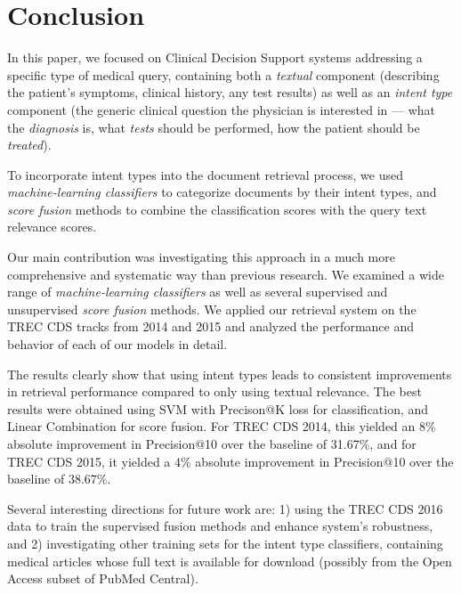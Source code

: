 \chapter{Conclusion}


In this paper, we focused on Clinical Decision Support systems addressing
a specific type of medical query, containing both a \emph{textual} component
(describing the patient's symptoms, clinical history, any test results)
as well as an \emph{intent type} component (the generic clinical question the physician is interested in
--- what the \emph{diagnosis} is, what \emph{tests} should be performed, how the patient should be \emph{treated}).

To incorporate intent types into the document retrieval process, we used
\emph{machine-learning classifiers} to categorize documents by their intent types,
and \emph{score fusion} methods to combine the classification scores with the query text relevance scores.

Our main contribution was investigating this approach in a much more comprehensive and systematic way
than previous research.
We examined a wide range of \emph{machine-learning classifiers}
as well as several supervised and unsupervised \emph{score fusion} methods.
We applied our retrieval system on the TREC CDS tracks from 2014 and 2015 and analyzed
the performance and behavior of each of our models in detail.

The results clearly show that using intent types leads to consistent improvements in retrieval performance
compared to only using textual relevance.
The best results were obtained using SVM with Precison@K loss for classification,
and Linear Combination for score fusion.
For TREC CDS 2014, this yielded an 8\% absolute improvement in Precision@10 over the baseline of 31.67\%,
and for TREC CDS 2015, it yielded a 4\% absolute improvement in Precision@10 over the baseline of 38.67\%.

Several interesting directions for future work are:
1) using the TREC CDS 2016 data to train the supervised fusion methods and enhance system's robustness,
and 2) investigating other training sets for the
intent type classifiers, containing medical articles whose full text is available for download
(possibly from the Open Access subset of PubMed Central).

